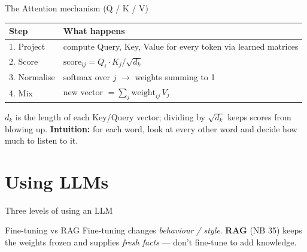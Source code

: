 \documentclass[aspectratio=169,11pt]{beamer}
\begin{document}
\begin{frame}{The Attention mechanism (Q / K / V)}
  \small
  \begin{center}
  \begin{tabular}{ll}
    \toprule
    \textbf{Step} & \textbf{What happens} \\
    \midrule
    1. Project   & compute Query, Key, Value for every token via learned matrices \\
    2. Score     & $\mathrm{score}_{ij} = Q_i \cdot K_j / \sqrt{d_k}$ \\
    3. Normalise & softmax over $j$ $\to$ weights summing to 1 \\
    4. Mix       & new vector $= \sum_j \mathrm{weight}_{ij}\, V_j$ \\
    \bottomrule
  \end{tabular}
  \end{center}
  \vspace{2pt}
  {\footnotesize $d_k$ is the length of each Key/Query vector; dividing by $\sqrt{d_k}$ keeps scores from blowing up. \textbf{Intuition:} for each word, look at every other word and decide how much to listen to it.}
\end{frame}

\section{Using LLMs}
\begin{frame}{Three levels of using an LLM}
  \begin{center}
  \end{center}
  \begin{exampleblock}{Fine-tuning vs RAG}
    Fine-tuning changes \emph{behaviour / style}. \textbf{RAG} (NB 35) keeps the weights frozen and supplies \emph{fresh facts} --- don't fine-tune to add knowledge.
  \end{exampleblock}
\end{frame}
\end{document}
